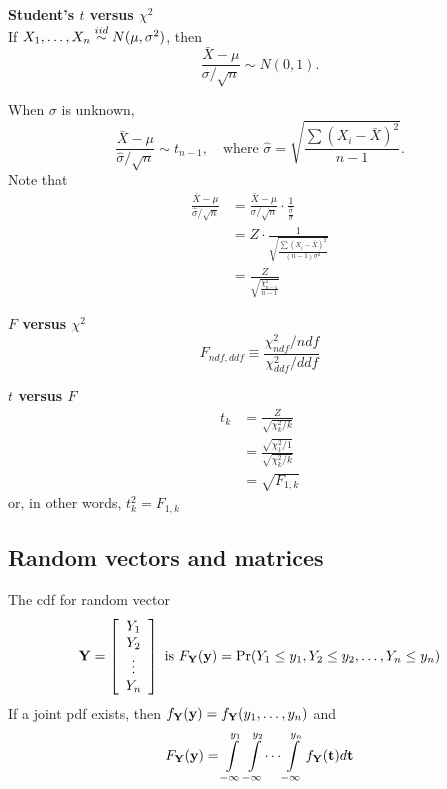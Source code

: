 {\bf Student's $t$ versus $\chi^2$}\\

If $X_1, \dots, X_n \overset{iid}{\sim} N(\mu, \sigma^2)$, then
$$
\frac{\bar{X} - \mu}{\sigma / \sqrt{n}} \sim N(0, 1).
$$

When $\sigma$ is unknown,
$$
\frac{\bar{X} - \mu}{\hat{\sigma} / \sqrt{n}} \sim t_{n - 1}, \quad \mbox{where } \hat{\sigma} = \sqrt{\frac{\sum(X_i - \bar{X})^2}{n - 1}}.
$$
Note that
$$
\begin{aligned}
\frac{\bar{X} - \mu}{\hat{\sigma} / \sqrt{n}}
&= \frac{\bar{X} - \mu}{{\sigma} / \sqrt{n}} \cdot \frac{1}{\frac{\hat{\sigma}}{\sigma}}\\
&= Z \cdot \frac{1}{\sqrt{\frac{\sum(X_i - \bar{X})^2}{(n - 1)\sigma^2}}}\\
&= \frac{Z}{\sqrt{\frac{\chi_{n - 1}^2}{n - 1}}}
\end{aligned}
$$

{\bf $F$ versus $\chi^2$}\\

$$
F_{ndf, ddf} \equiv \frac{\chi^2_{ndf}/{ndf}}{\chi^2_{ddf}/{ddf}}
$$

{\bf $t$ versus $F$}\\

$$
\begin{aligned}
t_k &= \frac{Z}{\sqrt{\chi^2_k/k}}\\
&= \frac{\sqrt{\chi^2_1/1}}{\sqrt{\chi^2_k/k}}\\
&= \sqrt{F_{1, k}}
\end{aligned}
$$
or, in other words, $t^2_k = F_{1, k}$

\subsection*{Random vectors and matrices}
The cdf for random vector
$$
\mathbf{Y} = \left[ \begin{array}{c} Y_1\\ Y_2\\ \vdots\\ Y_n\\ \end{array} \right] \mbox{ is }  F_{\mathbf{Y}}(\mathbf{y}) = \Pr(Y_1 \le y_1, Y_2 \le y_2, \dots, Y_n \le y_n)
$$
If a joint pdf exists, then $f_{\mathbf{Y}}(\mathbf{y}) = f_{\mathbf{Y}}(y_1, \dots, y_n)$ and 
$$
 F_{\mathbf{Y}}(\mathbf{y}) = \int\limits_{-\infty}^{y_1} \int\limits_{-\infty}^{y_2} \dots \int\limits_{-\infty}^{y_n} f_{\mathbf{Y}}(\mathbf{t})d\mathbf{t}
$$


